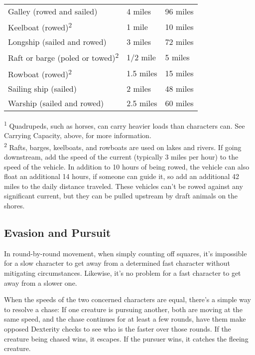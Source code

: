\begin{table}[htb]
\begin{tabular}{lll}
\hspace{1em}Galley (rowed and sailed) & 4 miles & 96 miles\\
\hspace{1em}Keelboat (rowed)\textsuperscript{2} & 1 mile & 10 miles\\
\hspace{1em}Longship (sailed and rowed) & 3 miles & 72 miles\\
\hspace{1em}Raft or barge (poled or towed)\textsuperscript{2} & 1/2 mile & 5 miles\\
\hspace{1em}Rowboat (rowed)\textsuperscript{2} & 1.5 miles & 15 miles\\
\hspace{1em}Sailing ship (sailed) & 2 miles & 48 miles\\
\hspace{1em}Warship (sailed and rowed) & 2.5 miles & 60 miles\\
\end{tabular}
\textsuperscript{1} Quadrupeds, such as horses, can carry heavier loads than characters can. See Carrying Capacity, above, for more information.\\
\textsuperscript{2} Rafts, barges, keelboats, and rowboats are used on lakes and rivers.
If going downstream, add the speed of the current (typically 3 miles per hour) to the speed of the vehicle. In addition to 10 hours of being rowed, the vehicle can also float an additional 14 hours, if someone can guide it, so add an additional 42 miles to the daily distance traveled. These vehicles can’t be rowed against any significant current, but they can be pulled upstream by draft animals on the shores.\\
\end{table}
									
\subsection{Evasion and Pursuit}

				
In round-by-round movement, when simply counting off squares, it's impossible for a slow character to get away from a determined fast character without mitigating circumstances. Likewise, it's no problem for a fast character to get away from a slower one. 
				
When the speeds of the two concerned characters are equal, there's a simple way to resolve a chase: If one creature is pursuing another, both are moving at the same speed, and the chase continues for at least a few rounds, have them make opposed Dexterity checks to see who is the faster over those rounds. If the creature being chased wins, it escapes. If the pursuer wins, it catches the fleeing creature. 
				
